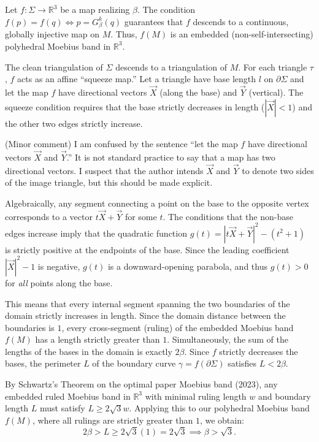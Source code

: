 \documentclass[12pt]{article}
\newcommand{\review}[1]{\begin{reviewbox}#1\end{reviewbox}}
\begin{document}
Let $f: \Sigma \to \mathbb{R}^3$ be a map realizing $\beta$. The condition $f(p)=f(q) \iff p = G_{\beta}^k(q)$ guarantees that $f$ descends to a continuous, globally injective map on $M$. Thus, $f(M)$ is an embedded (non-self-intersecting) polyhedral Moebius band in $\mathbb{R}^3$. 

The clean triangulation of $\Sigma$ descends to a triangulation of $M$. For each triangle $\tau$, $f$ acts as an affine ``squeeze map.'' Let a triangle have base length $l$ on $\partial \Sigma$ and let the map $f$ have directional vectors $\vec{X}$ (along the base) and $\vec{Y}$ (vertical). The squeeze condition requires that the base strictly decreases in length ($|\vec{X}| < 1$) and the other two edges strictly increase. 

\review{(Minor comment) I am confused by the sentence ``let the map $f$ have directional vectors $\vec X$ and $\vec Y$.'' It is not standard practice to say that a map has two directional vectors. I suspect that the author intends $\vec X$ and $\vec Y$ to denote two sides of the image triangle, but this should be made explicit.}

Algebraically, any segment connecting a point on the base to the opposite vertex corresponds to a vector $t \vec{X} + \vec{Y}$ for some $t$. The conditions that the non-base edges increase imply that the quadratic function $g(t) = |t \vec{X} + \vec{Y}|^2 - (t^2 + 1)$ is strictly positive at the endpoints of the base. Since the leading coefficient $|\vec{X}|^2 - 1$ is negative, $g(t)$ is a downward-opening parabola, and thus $g(t) > 0$ for \emph{all} points along the base. 

This means that every internal segment spanning the two boundaries of the domain strictly increases in length. Since the domain distance between the boundaries is $1$, every cross-segment (ruling) of the embedded Moebius band $f(M)$ has a length strictly greater than $1$. 
Simultaneously, the sum of the lengths of the bases in the domain is exactly $2\beta$. Since $f$ strictly decreases the bases, the perimeter $L$ of the boundary curve $\gamma = f(\partial \Sigma)$ satisfies $L < 2\beta$.

By Schwartz's Theorem on the optimal paper Moebius band (2023), any embedded ruled Moebius band in $\mathbb{R}^3$ with minimal ruling length $w$ and boundary length $L$ must satisfy $L \ge 2\sqrt{3} w$. 
Applying this to our polyhedral Moebius band $f(M)$, where all rulings are strictly greater than $1$, we obtain:
\[
2\beta > L \ge 2\sqrt{3}(1) = 2\sqrt{3} \implies \beta > \sqrt{3}.
\]
\end{document}
